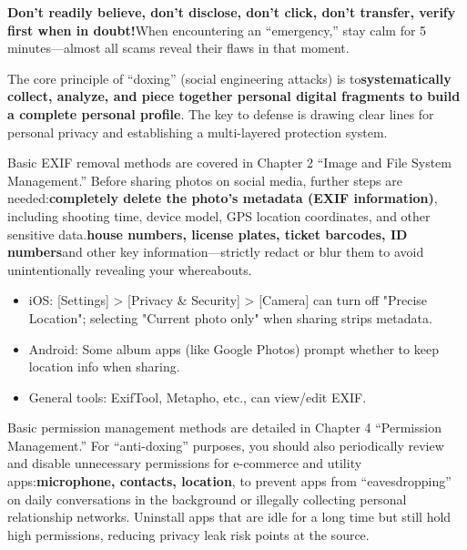 
\textbf{Don't readily believe, don't disclose, don't click, don't transfer, verify first when in doubt!}When encountering an “emergency,” stay calm for 5 minutes—almost all scams reveal their flaws in that moment.


The core principle of “doxing” (social engineering attacks) is to\textbf{systematically collect, analyze, and piece together personal digital fragments to build a complete personal profile}. The key to defense is drawing clear lines for personal privacy and establishing a multi-layered protection system.


Basic EXIF removal methods are covered in Chapter 2 “Image and File System Management.” Before sharing photos on social media, further steps are needed:\textbf{completely delete the photo's metadata (EXIF information)}, including shooting time, device model, GPS location coordinates, and other sensitive data.\textbf{house numbers, license plates, ticket barcodes, ID numbers}and other key information—strictly redact or blur them to avoid unintentionally revealing your whereabouts.

\begin{itemize}
  \item iOS: [Settings] > [Privacy \& Security] > [Camera] can turn off "Precise Location"; selecting "Current photo only" when sharing strips metadata.
  \item Android: Some album apps (like Google Photos) prompt whether to keep location info when sharing.
  \item General tools: ExifTool, Metapho, etc., can view/edit EXIF.
\end{itemize}


Basic permission management methods are detailed in Chapter 4 “Permission Management.” For “anti-doxing” purposes, you should also periodically review and disable unnecessary permissions for e-commerce and utility apps:\textbf{microphone, contacts, location}, to prevent apps from “eavesdropping” on daily conversations in the background or illegally collecting personal relationship networks. Uninstall apps that are idle for a long time but still hold high permissions, reducing privacy leak risk points at the source.

